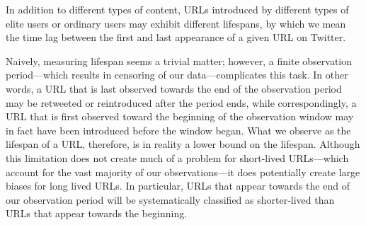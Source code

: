 \documentclass[phd,tocprelim]{cornell}
\begin{document}

In addition to different types of content, URLs introduced by different
types of elite users or ordinary users may exhibit different lifespans,
by which we mean the time lag between the first and last appearance of a
given URL on Twitter.

Naively, measuring lifespan seems a trivial matter; however, a finite
observation period---which results in censoring of our
data---complicates this task. In other words, a URL that is last observed
towards the end of the observation period may be retweeted or reintroduced
after the period ends, while correspondingly, a URL that is first observed
toward the beginning of the observation window may in fact have been
introduced before the window began. What we observe as the lifespan of a
URL, therefore, is in reality a lower bound on the lifespan. Although
this limitation does not create much of a problem for short-lived
URLs---which account for the vast majority of our observations---it does potentially
create large biases for long lived URLs. In particular, URLs that appear
towards the end of our observation period will be systematically classified
as shorter-lived than URLs that appear towards the beginning.

\end{document}
